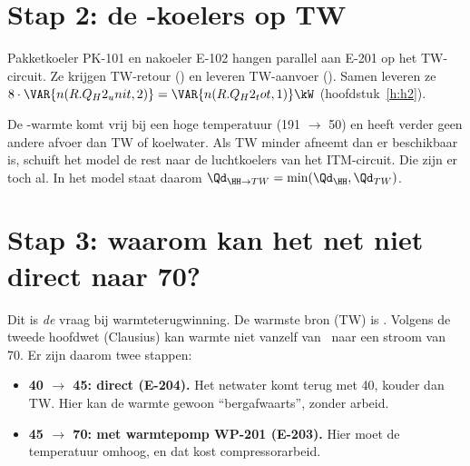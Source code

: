 \section{Stap 2: de \HH-koelers op TW}
Pakketkoeler PK-101 en nakoeler E-102 hangen parallel aan E-201 op het TW-circuit. Ze krijgen TW-retour
(\degC) en leveren TW-aanvoer (\degC). Samen leveren ze
$8\cdot\VAR{n(R.Q_H2_unit,2)} = \VAR{n(R.Q_H2_tot,1)}\kW$ (hoofdstuk~\ref{h:h2}).
\begin{waarom}
De \HH-warmte komt vrij bij een hoge temperatuur (191 $\rightarrow$ 50\degC) en heeft verder geen andere afvoer dan
TW of koelwater. Als TW minder afneemt dan er beschikbaar is, schuift het model de rest naar de luchtkoelers van het
ITM-circuit. Die zijn er toch al. In het model staat daarom $\Qd_{\HH\to TW} = \min(\Qd_{\HH},\Qd_{TW})$.
\end{waarom}

\section{Stap 3: waarom kan het net niet direct naar 70\degC?}
Dit is \emph{de} vraag bij warmteterugwinning. De warmste bron (TW) is \degC. Volgens de tweede
hoofdwet (Clausius) kan warmte niet vanzelf van \degC\ naar een stroom van 70\degC. Er zijn daarom
twee stappen:
\begin{itemize}
  \item \textbf{40 $\rightarrow$ 45\degC: direct (E-204).} Het netwater komt terug met 40\degC, kouder dan TW. Hier
        kan de warmte gewoon ``bergafwaarts'', zonder arbeid.
  \item \textbf{45 $\rightarrow$ 70\degC: met warmtepomp WP-201 (E-203).} Hier moet de temperatuur omhoog, en dat kost
        compressorarbeid.
\end{itemize}

